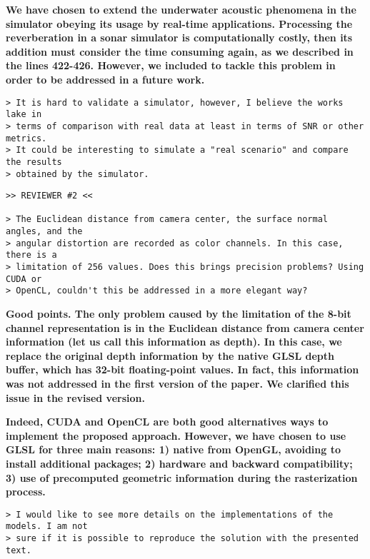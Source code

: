 \documentclass{article}
\begin{document}
\textbf{We have chosen to extend the underwater acoustic phenomena in the
simulator obeying its usage by real-time applications. Processing the
reverberation in a sonar simulator is computationally costly, then its
addition must consider the time consuming again, as we described in the
lines 422-426. However, we included to tackle this problem in order to be 
addressed in a future work.}

\begin{verbatim}
> It is hard to validate a simulator, however, I believe the works lake in
> terms of comparison with real data at least in terms of SNR or other metrics.
> It could be interesting to simulate a "real scenario" and compare the results
> obtained by the simulator.
\end{verbatim}


\begin{verbatim}
>> REVIEWER #2 <<

> The Euclidean distance from camera center, the surface normal angles, and the
> angular distortion are recorded as color channels. In this case, there is a
> limitation of 256 values. Does this brings precision problems? Using CUDA or
> OpenCL, couldn't this be addressed in a more elegant way?
\end{verbatim}


\textbf{Good points. The only problem caused by the limitation of the 8-bit channel 
representation is in the Euclidean distance from camera center information (let us call 
this information as depth). In this case, we replace the original depth information by
the native GLSL depth buffer, which has 32-bit floating-point values. In fact, this 
information was not addressed in the first version of the paper. We clarified this issue
in the revised version. }

\textbf{Indeed, CUDA and OpenCL are both good alternatives ways to implement
the proposed approach. However, we have chosen to use GLSL for three main reasons:
1) native from OpenGL, avoiding to install additional packages;
2) hardware and backward compatibility;
3) use of precomputed geometric information during the rasterization process.}

\begin{verbatim}
> I would like to see more details on the implementations of the models. I am not
> sure if it is possible to reproduce the solution with the presented text.
\end{verbatim}
\end{document}
